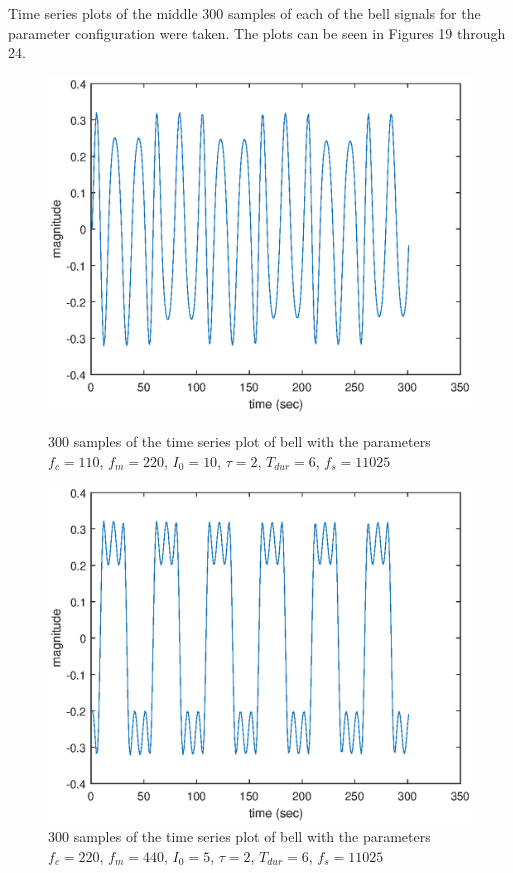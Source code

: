 \documentclass{article}
\begin{document}
Time series plots of the middle 300 samples of each of the bell signals for the parameter configuration were taken. The plots can be seen in Figures 19 through 24.
\begin{figure}[H]
	\centering
	\begin{minipage}{0.3\linewidth}
		\includegraphics[scale=0.3]{samp1}
		\caption{300 samples of the time series plot of bell with the parameters $f_c = 110$, $f_m = 220$, $I_0 = 10$, $\tau = 2$, $T_{dur} = 6$, $f_s = 11025$}
	\end{minipage}
	\hspace{4cm}
	\begin{minipage}{0.3\linewidth}
		\includegraphics[scale=0.3]{samp2}
		\caption{300 samples of the time series plot of bell with the parameters $f_c = 220$, $f_m = 440$, $I_0 = 5$, $\tau = 2$, $T_{dur} = 6$, $f_s = 11025$}
	\end{minipage}
\end{figure}
\end{document}
